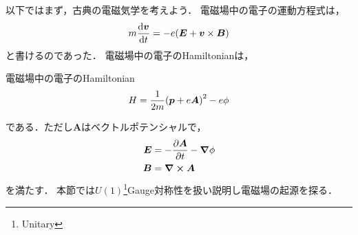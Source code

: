 \documentclass{report}
\begin{document}
  以下ではまず，古典の電磁気学を考えよう．
  電磁場中の電子の運動方程式は，
  \begin{align}
    m\dv{\bm{v}}{t} = -e\qty(\bm{E} + \bm{v}\times\bm{B})
  \end{align}
  と書けるのであった．
  電磁場中の電子のHamiltonianは，
  \begin{itembox}[l]{電磁場中の電子のHamiltonian}
    \begin{align}
      H = \frac{1}{2m}\qty(\bm{p} + e\bm{A})^2 - e\phi
    \end{align}
  \end{itembox}
  である．ただし$\bm{A}$はベクトルポテンシャルで，
  \begin{align}
    \bm{E} &= -\pdv{\bm{A}}{t} - \grad\phi \\ 
    \bm{B} &= \curl\bm{A}
  \end{align}
  を満たす．
  本節では$U(1)$\footnote{Unitary}Gauge対称性を扱い説明し電磁場の起源を探る．
\end{document}
